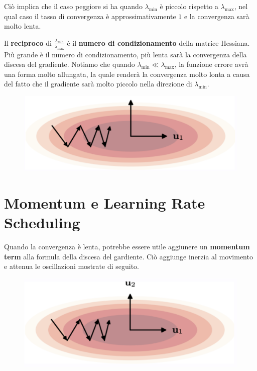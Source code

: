 Ciò implica che il caso peggiore si ha quando $\lambda_{\text{min}}$ è piccolo rispetto a $\lambda_{\text{max}}$, nel qual caso il tasso di convergenza è approssimativamente $1$ e la convergenza sarà molto lenta.



Il \textbf{reciproco} di $\frac{\lambda_{\text{min}}}{\lambda_{\text{max}}}$ è il \textbf{numero di condizionamento} della matrice Hessiana. Più grande è il numero di condizionamento, più lenta sarà la convergenza della discesa del gradiente.
\newline
\newline
Notiamo che quando $\lambda_{\text{min}}\ll\lambda_{\text{max}}$, la funzione errore avrà una forma molto allungata, la quale renderà la convergenza molto lonta a causa del fatto che il gradiente sarà molto piccolo nella direzione di $\lambda_{\text{min}}$.
\begin{figure}[h]
    \includegraphics[scale=.5]{images/best_practices/shape.png}
    \centering
\end{figure}
\newpage
\section{Momentum e Learning Rate Scheduling}
Quando la convergenza è lenta, potrebbe essere utile aggiunere un \textbf{momentum term} alla formula della discesa del gardiente. Ciò aggiunge inerzia al movimento e attenua le oscillazioni mostrate di seguito.
\begin{figure}[h]
    \includegraphics[scale=.5]{images/best_practices/momentum.png}
    \centering
\end{figure}


